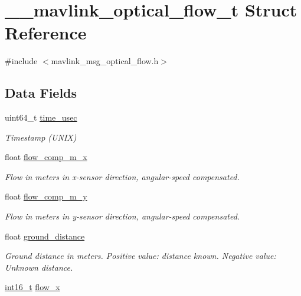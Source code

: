 \hypertarget{struct____mavlink__optical__flow__t}{\section{\-\_\-\-\_\-mavlink\-\_\-optical\-\_\-flow\-\_\-t Struct Reference}
\label{struct____mavlink__optical__flow__t}
}


{\ttfamily \#include $<$mavlink\-\_\-msg\-\_\-optical\-\_\-flow.\-h$>$}

\subsection*{Data Fields}
\begin{DoxyCompactItemize}
\item 
uint64\-\_\-t \hyperlink{struct____mavlink__optical__flow__t_a01f76c236ab67155fe7770f82eb86ad6}{time\-\_\-usec}
\begin{DoxyCompactList}\small\item\em Timestamp (U\-N\-I\-X) \end{DoxyCompactList}\item 
float \hyperlink{struct____mavlink__optical__flow__t_ab8fab603e276328627e4d96cc4f8b086}{flow\-\_\-comp\-\_\-m\-\_\-x}
\begin{DoxyCompactList}\small\item\em Flow in meters in x-\/sensor direction, angular-\/speed compensated. \end{DoxyCompactList}\item 
float \hyperlink{struct____mavlink__optical__flow__t_a2e39bcd7b74a5c660d1684c8e44e2cca}{flow\-\_\-comp\-\_\-m\-\_\-y}
\begin{DoxyCompactList}\small\item\em Flow in meters in y-\/sensor direction, angular-\/speed compensated. \end{DoxyCompactList}\item 
float \hyperlink{struct____mavlink__optical__flow__t_a89b39010e211494ffecc65c29fdd8c0e}{ground\-\_\-distance}
\begin{DoxyCompactList}\small\item\em Ground distance in meters. Positive value\-: distance known. Negative value\-: Unknown distance. \end{DoxyCompactList}\item 
\hyperlink{stdint_8h_aa343fa3b3d06292b959ffdd4c4703b06}{int16\-\_\-t} \hyperlink{struct____mavlink__optical__flow__t_a1e1332d4eb9a84f38d32af8f32ed8c10}{flow\-\_\-x}

\end{DoxyCompactItemize}
